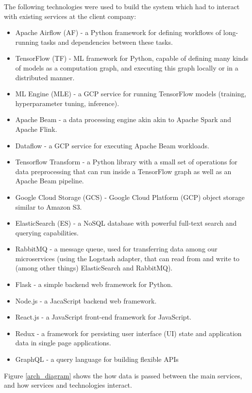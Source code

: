  The following technologies were used to build the system which had to interact with existing services  at the client company:

\begin{itemize}
  \item Apache Airflow (AF) - a Python framework for defining workflows of long-running tasks and dependencies between these tasks.
  \item TensorFlow (TF) - ML framework for Python, capable of defining many kinds of models as a computation graph, and executing this graph locally or in a distributed manner.
  \item ML Engine (MLE) - a GCP service for running TensorFlow models (training, hyperparameter tuning, inference).
  \item Apache Beam - a data processing engine akin akin to Apache Spark and Apache Flink.
  \item Dataflow - a GCP service for executing Apache Beam workloads.
  \item Tensorflow Transform - a Python library with a small set of operations for data preprocessing that can run inside a TensorFlow graph as well as an Apache Beam pipeline.
  \item Google Cloud Storage (GCS) - Google Cloud Platform (GCP) object storage similar to Amazon S3.
  \item ElasticSearch (ES) - a NoSQL database with powerful full-text search and querying capabilities.
  \item RabbitMQ - a message queue, used for transferring data among our microservices (using the Logstash adapter, that can read from and write to (among other things) ElasticSearch and RabbitMQ).
  \item Flask - a simple backend web framework for Python.
  \item Node.js - a JacaScript backend web framework.
  \item React.js - a JavaScript front-end framework for JavaScript.
  \item Redux - a framework for persisting user interface (UI) state and application data in single page applications.
  \item GraphQL - a query language for building flexible APIs
\end{itemize}

Figure \ref{arch_diagram} shows the how data is passed between the main services, and how services and technologies interact.

